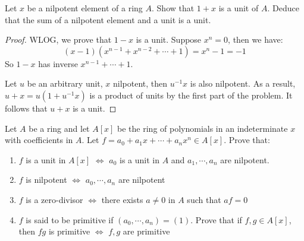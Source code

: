 \documentclass{solution}
\begin{document}
\begin{problem}{1}
    Let $x$ be a nilpotent element of a ring $A$. Show that $1 + x$ is a unit of $A$. Deduce that the sum of a nilpotent element and a unit is a unit.
\end{problem}

\begin{proof}
    WLOG, we prove that $1 - x$ is a unit. Suppose $x^n = 0$, then we have:
    $$(x - 1)(x^{n - 1} + x^{n - 2} + \cdots + 1) = x^n - 1 = -1$$
    So $1 - x$ has inverse $x^{n - 1} + \cdots + 1$.

    Let $u$ be an arbitrary unit, $x$ nilpotent, then $u ^{-1} x$ is also nilpotent. As a result, $u + x = u(1 + u ^{-1} x)$ is a product of units by the first part of the problem. It follows that $u + x$ is a unit.
\end{proof}

\begin{problem}{2}
    Let $A$ be a ring and let $A[x]$ be the ring of polynomials in an indeterminate $x$ with coefficients in $A$. Let $f = a_0 + a_1x + \cdots + a_nx^n \in A[x]$. Prove that:
    \begin{enumerate}
        \item $f$ is a unit in $A[x]$ $\Leftrightarrow$ $a_0$ is a unit in $A$ and $a_1, \cdots, a_n$ are nilpotent.
        \item $f$ is nilpotent $\Leftrightarrow$ $a_0, \cdots, a_n$ are nilpotent
        \item $f$ is a zero-divisor $\Leftrightarrow$ there exists $a \ne 0$ in $A$ such that $af = 0$
        \item $f$ is said to be primitive if $(a_0, \cdots, a_n) = (1)$. Prove that if $f, g \in A[x]$, then $fg$ is primitive $\Leftrightarrow$ $f, g$ are primitive
    \end{enumerate}
\end{problem}
\end{document}
